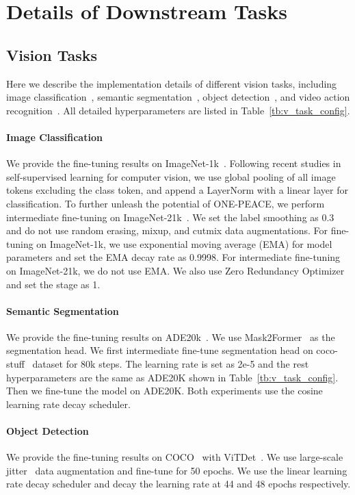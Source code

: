 \documentclass{article}
\newcommand{\onepeace}{ONE-PEACE\xspace}
\begin{document}
\section{Details of Downstream Tasks}
\label{app:downstream_tasks}


\subsection{Vision Tasks}
\label{app:vision_details}
Here we describe the implementation details of different vision tasks, including image classification~\cite{inet1k}, semantic segmentation~\cite{Zhou2016SemanticUO}, object detection~\cite{mscoco}, and video action recognition~\cite{k400}.
All detailed hyperparameters are listed in Table~\ref{tb:v_task_config}.

\paragraph{Image Classification}
We provide the fine-tuning results on ImageNet-1k~\cite{inet1k}. Following recent studies in self-supervised learning for computer vision, we use global pooling of all image tokens excluding the class token, and append a LayerNorm with a linear layer for classification. To further unleash the potential of \onepeace, we perform intermediate fine-tuning on ImageNet-21k~\cite{imagenet}. We set the label smoothing as 0.3 and do not use random erasing, mixup, and cutmix data augmentations. For fine-tuning on ImageNet-1k, we use exponential moving average (EMA) for model parameters and set the EMA decay rate as 0.9998. For intermediate fine-tuning on ImageNet-21k, we do not use EMA. We also use Zero Redundancy Optimizer~\cite{zero} and set the stage as 1.

\paragraph{Semantic Segmentation}
We provide the fine-tuning results on ADE20k~\cite{Zhou2016SemanticUO}. We use Mask2Former~\cite{mask2former} as the segmentation head. We first intermediate fine-tune segmentation head on coco-stuff~\cite{cocostuff} dataset for 80k steps. The learning rate is set as 2e-5 and the rest hyperparameters are the same as ADE20K shown in Table~\ref{tb:v_task_config}. Then we fine-tune the model on ADE20K. Both experiments use the cosine learning rate decay scheduler.

\paragraph{Object Detection}
We provide the fine-tuning results on COCO~\cite{mscoco} with ViTDet~\cite{vitdet}. We use large-scale jitter~\cite{lsj} data augmentation and fine-tune for 50 epochs. We use the linear learning rate decay scheduler and decay the learning rate at 44 and 48 epochs respectively.
\end{document}
